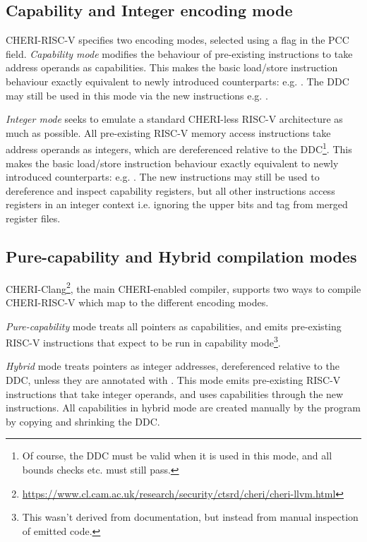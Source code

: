 \subsection{Capability and Integer encoding mode\label{chap:bg:subsec:cheriencodingmode}}
CHERI-RISC-V specifies two encoding modes, selected using a flag in the PCC  field.
\emph{Capability mode} modifies the behaviour of pre-existing instructions to take address operands as capabilities.
This makes the basic load/store instruction behaviour exactly equivalent to newly introduced counterparts: e.g. .
The DDC may still be used in this mode via the new instructions e.g. .

\pagebreak
\emph{Integer mode} seeks to emulate a standard CHERI-less RISC-V architecture as much as possible.
All pre-existing RISC-V memory access instructions take address operands as integers, which are dereferenced relative to the DDC\footnote{Of course, the DDC must be valid when it is used in this mode, and all bounds checks etc. must still pass.}.
This makes the basic load/store instruction behaviour exactly equivalent to newly introduced counterparts: e.g. .
The new instructions may still be used to dereference and inspect capability registers, but all other instructions access registers in an integer context i.e. ignoring the upper bits and tag from merged register files.

\subsection{Pure-capability and Hybrid compilation modes}\label{cheri_purecap_hybrid}
CHERI-Clang\footnote{\url{https://www.cl.cam.ac.uk/research/security/ctsrd/cheri/cheri-llvm.html}}, the main CHERI-enabled compiler, supports two ways to compile CHERI-RISC-V which map to the different encoding modes.

\emph{Pure-capability} mode treats all pointers as capabilities, and emits pre-existing RISC-V instructions that expect to be run in capability mode\footnote{This wasn't derived from documentation, but instead from manual inspection of emitted code.}.

\emph{Hybrid} mode treats pointers as integer addresses, dereferenced relative to the DDC, unless they are annotated with .
This mode emits pre-existing RISC-V instructions that take integer operands, and uses capabilities through the new instructions.
All capabilities in hybrid mode are created manually by the program by copying and shrinking the DDC.

